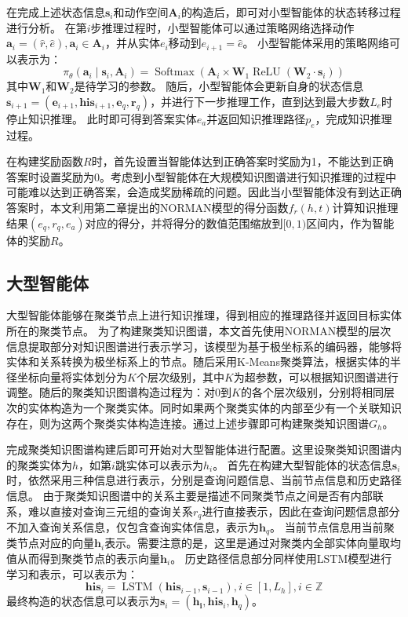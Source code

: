 \documentclass[algorithmlist, AutoFakeBold, AutoFakeSlant, figurelist, tablelist, nomlist, engineering]{seuthesix}
\begin{document}
在完成上述状态信息$\bm{s}_i$和动作空间$\bm{A}_i$的构造后，即可对小型智能体的状态转移过程进行分析。
在第$i$步推理过程时，小型智能体可以通过策略网络选择动作$\bm{a}_i = (\hat{r}, \hat{e}), \bm{a}_i \in \bm{A}_i$，并从实体$e_i$移动到$e_{i+1} = \hat{e}$。
小型智能体采用的策略网络可以表示为：
\begin{equation}
  \pi_\theta\left(\bm{a}_i \mid \bm{s}_i, \bm{A}_i\right) =\operatorname{Softmax}\left(\bm{A}_i \times \mathbf{W}_1 \operatorname{ReLU}\left(\mathbf{W}_2 \cdot \bm{s}_i\right)\right)
\end{equation}
其中$\mathbf{W}_1$和$\mathbf{W}_2$是待学习的参数。
随后，小型智能体会更新自身的状态信息$\bm{s}_{i+1} = (\bm{e}_{i+1}, \bm{his}_{i+1}, \bm{e}_q, \bm{r}_q)$，并进行下一步推理工作，直到达到最大步数$L_e$时停止知识推理。
此时即可得到答案实体$e_a$并返回知识推理路径$p_e$，完成知识推理过程。

在构建奖励函数$R$时，首先设置当智能体达到正确答案时奖励为1，不能达到正确答案时设置奖励为0。考虑到小型智能体在大规模知识图谱进行知识推理的过程中可能难以达到正确答案，会造成奖励稀疏的问题。因此当小型智能体没有到达正确答案时，本文利用第二章提出的NORMAN模型的得分函数$f_r(h, t)$计算知识推理结果$(e_q, r_q, e_a)$对应的得分，并将得分的数值范围缩放到$[0, 1)$区间内，作为智能体的奖励$R$。

\subsection{大型智能体}
大型智能体能够在聚类节点上进行知识推理，得到相应的推理路径并返回目标实体所在的聚类节点。
为了构建聚类知识图谱，本文首先使用NORMAN模型的层次信息提取部分对知识图谱进行表示学习，该模型为基于极坐标系的编码器，能够将实体和关系转换为极坐标系上的节点。随后采用K-Means聚类算法，根据实体的半径坐标向量将实体划分为$K$个层次级别，其中$K$为超参数，可以根据知识图谱进行调整。随后的聚类知识图谱构造过程为：对0到$K$的各个层次级别，分别将相同层次的实体构造为一个聚类实体。同时如果两个聚类实体的内部至少有一个关联知识存在，则为这两个聚类实体构造连接。通过上述步骤即可构建聚类知识图谱$G_h$。

完成聚类知识图谱构建后即可开始对大型智能体进行配置。这里设聚类知识图谱内的聚类实体为$h$，如第$i$跳实体可以表示为$h_i$。
首先在构建大型智能体的状态信息$\bm{s}_i$时，依然采用三种信息进行表示，分别是查询问题信息、当前节点信息和历史路径信息。
由于聚类知识图谱中的关系主要是描述不同聚类节点之间是否有内部联系，难以直接对查询三元组的查询关系$r_q$进行直接表示，因此在查询问题信息部分不加入查询关系信息，仅包含查询实体信息，表示为$\bm{h}_q$。
当前节点信息用当前聚类节点对应的向量$\bm{h}_i$表示。需要注意的是，这里是通过对聚类内全部实体向量取均值从而得到聚类节点的表示向量$\bm{h}_i$。
历史路径信息部分同样使用LSTM模型进行学习和表示，可以表示为：
\begin{equation}
  \bm{his}_i=\operatorname{LSTM}\left(\bm{his}_{i - 1}, \bm{s}_{i - 1}\right), i \in [1, L_h], i \in \mathbb{Z}
\end{equation}
最终构造的状态信息可以表示为$\bm{s}_i = (\bm{h_i}, \bm{his}_i, \bm{h}_q)$。
\end{document}
